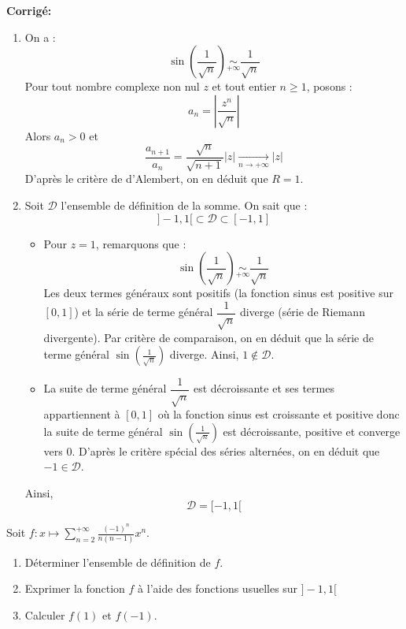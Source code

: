 \documentclass[a4paper,twoside,french,11pt]{VcCours}
\newcommand{\corr}{\textbf{Corrigé:}}
\begin{document}
\corr 

\begin{enumerate}
\item On a :
$$ \sin \left( \frac{1}{\sqrt{n}} \right) \underset{+ \infty}{\sim} \dfrac{1}{\sqrt{n}}$$
Pour tout nombre complexe non nul $z$ et tout entier $n \geq 1$, posons :
$$  a_n = \left\vert \dfrac{z^n}{ \sqrt{n}} \right\vert$$
Alors $a_n>0$ et 
$$ \dfrac{a_{n+1}}{a_n} = \dfrac{\sqrt{n}}{\sqrt{n+1}} \vert z \vert \underset{ n \rightarrow+ \infty}{\longrightarrow} \vert z \vert$$
D'après le critère de d'Alembert, on en déduit que $R=1$.
\item Soit $\mathcal{D}$ l'ensemble de définition de la somme. On sait que : 
$$ ]-1,1[ \subset \mathcal{D} \subset [-1,1]$$
\begin{itemize}
\item Pour $z=1$, remarquons que :
$$ \sin \left( \frac{1}{\sqrt{n}} \right) \underset{+ \infty}{\sim} \dfrac{1}{\sqrt{n}} $$
Les deux termes généraux sont positifs (la fonction sinus est positive sur $[0,1]$) et la série de terme général $\dfrac{1}{\sqrt{n}}$ diverge (série de Riemann divergente). Par critère de comparaison, on en déduit que la série de terme général $\sin \left( \frac{1}{\sqrt{n}} \right)$ diverge. Ainsi, $1 \notin \mathcal{D}$.
\item La suite de terme général $\dfrac{1}{\sqrt{n}}$ est décroissante et ses termes appartiennent à $[0,1]$ où la fonction sinus est croissante et positive donc la suite de terme général $\sin \left( \frac{1}{\sqrt{n}} \right)$ est décroissante, positive et converge vers $0$. D'après le critère spécial des séries alternées, on en déduit que $-1 \in \mathcal{D}$.
\end{itemize}
Ainsi,
$$ \mathcal{D}= [-1,1[$$
\end{enumerate}

\begin{Exercice}{} Soit $f : x \mapsto \sum_{n = 2}^{ + \infty} \frac{( - 1)^{n}}{n(n - 1)}x^{n}.$

  \begin{enumerate}
  \item
    Déterminer l'ensemble de définition de $f$.
  \item
    Exprimer la fonction $f$ à l'aide des fonctions usuelles sur $] - 1,1[$
  \item Calculer $f(1)$ et $f( - 1)$.
  \end{enumerate}
  \end{Exercice} 
  
  
\end{document}
